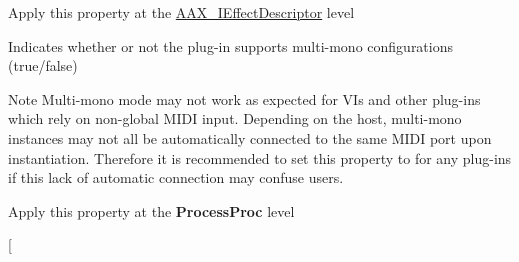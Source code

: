 \begin{Desc}
\begin{description}
\begin{DoxyItemize}
\item Apply this property at the \hyperlink{a00096}{A\+A\+X\+\_\+\+I\+Effect\+Descriptor} level \end{DoxyItemize}
\item[{\em 
\hypertarget{a00283_a6571f4e41a5dd06e4067249228e2249ea83f671685958bdc668ef574d5a2d92b0}{}A\+A\+X\+\_\+e\+Property\+\_\+\+Constraint\+\_\+\+Multi\+Mono\+Support\label{a00283_a6571f4e41a5dd06e4067249228e2249ea83f671685958bdc668ef574d5a2d92b0}
}]Indicates whether or not the plug-\/in supports multi-\/mono configurations ({\ttfamily true/{\ttfamily false})} \begin{DoxyNote}{Note}
Multi-\/mono mode may not work as expected for V\+Is and other plug-\/ins which rely on non-\/global M\+I\+D\+I input. Depending on the host, multi-\/mono instances may not all be automatically connected to the same M\+I\+D\+I port upon instantiation. Therefore it is recommended to set this property to {} for any plug-\/ins if this lack of automatic connection may confuse users.
\end{DoxyNote}
\begin{DoxyItemize}
\item Apply this property at the {\bfseries Process\+Proc} level \end{DoxyItemize}
\item[{\em 
\hypertarget{a00283_a6571f4e41a5dd06e4067249228e2249ea8e40ab2f92cb2c7c65803f799f7fd023}{}A\+A\+X\+\_\+e\+Property\+\_\+\+Max\+Constraint\+Prop\label{a00283_a6571f4e41a5dd06e4067249228e2249ea8e40ab2f92cb2c7c65803f799f7fd023}
}]\item[{\em 
}
\end{description}
\end{Desc}
